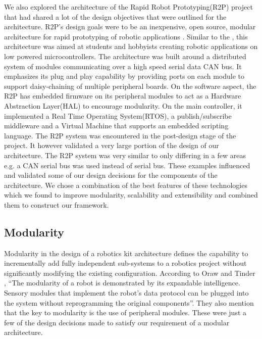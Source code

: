 We also explored the architecture of the Rapid Robot Prototyping(R2P) project that had shared a lot of the design objectives that were outlined for the \xten architecture. R2P's design goals were to be an inexpensive, open source, modular architecture for rapid prototyping of robotic applications \parencite{r2p}. Similar to the \xten, this architecture was aimed at students and hobbyists creating robotic applications on low powered microcontrollers. The architecture was built around a distributed system of modules communicating over a high speed serial data CAN bus. It emphasizes its plug and play capability by providing ports on each module to support daisy-chaining of multiple peripheral boards. On the software aspect, the R2P has embedded firmware on its peripheral modules to act as a Hardware Abstraction Layer(HAL) to encourage modularity. On the main controller, it implemented a Real Time Operating System(RTOS), a publish/subscribe middleware and a Virtual Machine that supports an embedded scripting language. The R2P system was encountered in the post-design stage of the \xten project. It however validated a very large portion of the design of our architecture. The R2P system was very similar to \xten only differing in a few areas e.g. a CAN serial bus was used instead of \iic serial bus. 
%
%
These examples influenced and validated some of our design decisions for the components of the \xten architecture. We chose a combination of the best features of these technologies which we found to improve modularity, scalability and extensibility and combined them to construct our framework. 






\subsection{Modularity} %
\label{sub:modularity}
Modularity in the design of a robotics kit architecture defines the capability to incrementally add fully independent sub-systems to a robotics project without significantly modifying the existing configuration. According to Oraw and Tinder \parencite{mars}, ``The modularity of a robot is demonstrated by its expandable intelligence. Sensory modules that implement the robot's data protocol can be plugged into the system without reprogramming the original components''. They also mention that the key to modularity is the use of peripheral modules. These were just a few of the design decisions made to satisfy our requirement of a modular architecture. 

